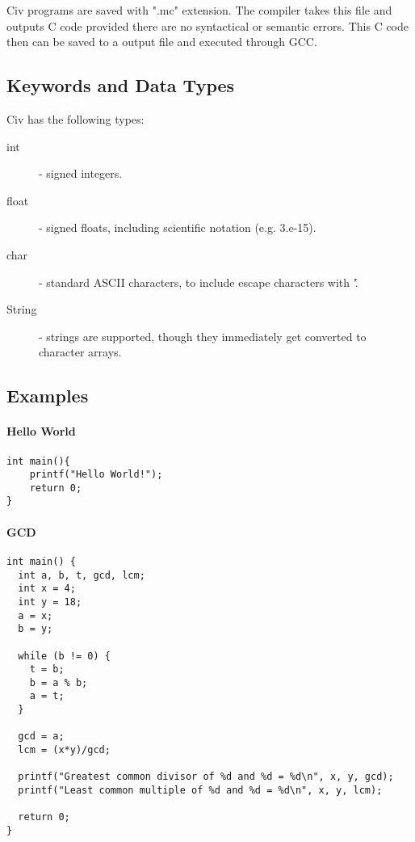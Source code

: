 \documentclass[a4paper]{article}
\begin{document}
Civ programs are saved with ".mc" extension. The compiler takes this file and outputs C code provided there are no syntactical or semantic errors. This C code then can be saved to a output file and executed through GCC. 

\subsection{Keywords and Data Types}
Civ has the following types:
\begin{description}
    \item[int] - signed integers.
    \item[float] - signed floats, including scientific notation (e.g. 3.e-15).
    \item[char] - standard ASCII characters, to include escape characters with '\'.
    \item[String] - strings are supported, though they immediately get converted to character arrays. 
\end{description}

\subsection{Examples}
\paragraph{Hello World}
\begin{verbatim}
int main(){
    printf("Hello World!");
    return 0;
}
\end{verbatim}

\paragraph{GCD}
\begin{verbatim}
int main() {
  int a, b, t, gcd, lcm;
  int x = 4;
  int y = 18;
  a = x;
  b = y;

  while (b != 0) {
    t = b;
    b = a % b;
    a = t;
  }

  gcd = a;
  lcm = (x*y)/gcd;

  printf("Greatest common divisor of %d and %d = %d\n", x, y, gcd);
  printf("Least common multiple of %d and %d = %d\n", x, y, lcm);

  return 0;
}
\end{verbatim}
\end{document}
